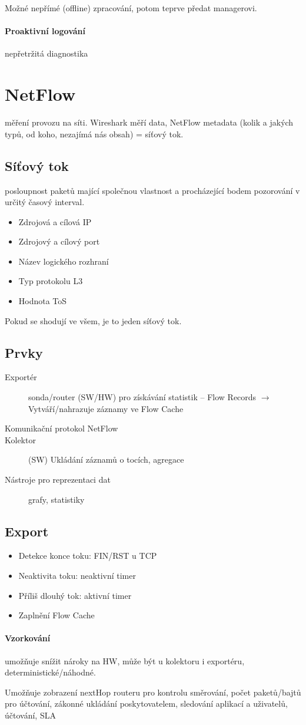 \documentclass[a4wide]{report}
\begin{document}
Možné nepřímé (offline) zpracování, potom teprve předat managerovi.

\paragraph{Proaktivní logování} nepřetržitá diagnostika

\section{NetFlow}
měření provozu na síti. Wireshark měří data, NetFlow metadata (kolik a jakých typů, od koho, nezajímá nás obsah) = síťový tok.

\subsection{Síťový tok}
posloupnost paketů mající společnou vlastnost  a procházející bodem pozorování v určitý časový interval.
\begin{itemize}
	\item Zdrojová a cílová IP
	\item Zdrojový a cílový port
	\item Název logického rozhraní
	\item Typ protokolu L3
	\item Hodnota ToS
\end{itemize}
Pokud se shodují ve všem, je to jeden síťový tok.

\subsection{Prvky}
\begin{description}
	\item[Exportér] sonda/router (SW/HW) pro získávání statistik -- Flow Records $\to$ Vytváří/nahrazuje záznamy ve Flow Cache
	\item[Komunikační protokol NetFlow]
	\item[Kolektor] (SW) Ukládání záznamů o tocích, agregace
	\item[Nástroje pro reprezentaci dat] grafy, statistiky
\end{description}

\subsection{Export}
\begin{itemize}
	\item Detekce konce toku: FIN/RST u TCP
	\item Neaktivita toku: neaktivní timer
	\item Příliš dlouhý tok: aktivní timer
	\item Zaplnění Flow Cache
\end{itemize}

\paragraph{Vzorkování}
umožňuje snížit nároky na HW, může být u kolektoru i exportéru, deterministické/náhodné.

Umožňuje zobrazení nextHop routeru pro kontrolu směrování, počet paketů/bajtů pro účtování, zákonné ukládání poskytovatelem, sledování aplikací a uživatelů, účtování, SLA
\end{document}
